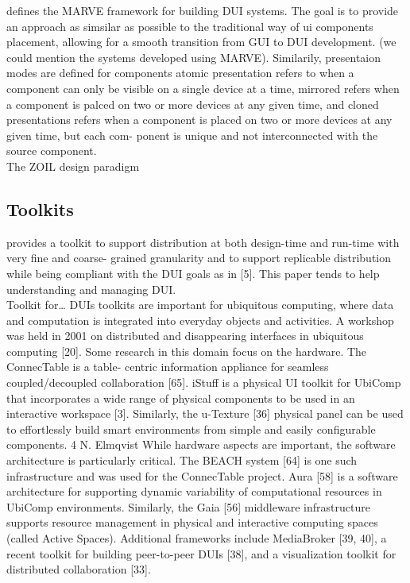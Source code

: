 \cite{froberg2011model} defines the MARVE framework for building DUI
systems. The goal is to provide an approach as simsilar as possible to
the traditional way of ui components placement, allowing for a smooth
transition from GUI to DUI development. (we could mention the systems
developed using MARVE). Similarily, presentaion modes are defined for components
atomic presentation refers to when a component can only be visible on a single
device at a time, mirrored refers when a component is palced on two or more
devices at any given time, and cloned presentations refers when a component is
placed on two or more devices at any given time, but each com- ponent is unique
and not interconnected with the source component.\\

The ZOIL design paradigm \cite{jetter2012design}
 
\subsection{Toolkits}
\cite{melchior2011distribution} provides a toolkit to support distribution
at both design-time and run-time with very fine and coarse- grained granularity and to support replicable distribution while being compliant with the DUI goals as in [5]. This paper tends to help understanding and managing DUI.\\


\cite{melchior69toolkit} Toolkit for\ldots
\cite{elmqvist2011distributed}
DUIs toolkits are important for ubiquitous computing, where data and computation is integrated into everyday objects and activities. A workshop was held in 2001 on distributed and disappearing interfaces in ubiquitous computing [20].
Some research in this domain focus on the hardware. The ConnecTable is a table- centric information appliance for seamless coupled/decoupled collaboration [65]. iStuff is a physical UI toolkit for UbiComp that incorporates a wide range of physical components to be used in an interactive workspace [3]. Similarly, the u-Texture [36] physical panel can be used to effortlessly build smart environments from simple and easily configurable components.
4 N. Elmqvist
While hardware aspects are important, the software architecture is particularly critical. The BEACH system [64] is one such infrastructure and was used for the ConnecTable project. Aura [58] is a software architecture for supporting dynamic variability of computational resources in UbiComp environments. Similarly, the Gaia [56] middleware infrastructure supports resource management in physical and interactive computing spaces (called Active Spaces). Additional frameworks include MediaBroker [39, 40], a recent toolkit for building peer-to-peer DUIs [38], and a visualization toolkit for distributed collaboration [33].


